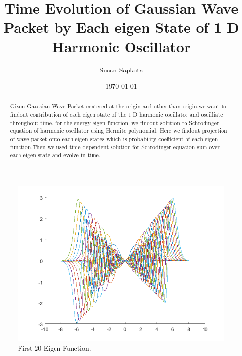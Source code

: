 \documentclass[letterpaper,12pt]{article}
\title{Time Evolution of Gaussian Wave Packet by Each eigen State of 1 D Harmonic Oscillator}
\author{Susan Sapkota}
\date{\today}
\begin{document}
\maketitle
\begin{abstract}
Given Gaussian Wave Packet centered at the origin and other than origin,we want to findout contribution of each eigen state of the 1 D harmonic oscillator and oscilliate throughout time. for the energy eigen function, we findout solution to  Schrodinger equation of harmonic oscillator  using Hermite polynomial. Here we findout projection of wave packet onto each eigen states which is probability coefficient of each eigen function.Then we used time dependent solution for Schrodinger equation sum over each eigen state and evolve in time.
\end{abstract}
\begin{figure}
  \includegraphics[width=\linewidth]{eigenstates.png}
  \caption{First 20 Eigen Function.}
  \label{fig:first 20 Eigen Function}
\end{figure}
\end{document}
